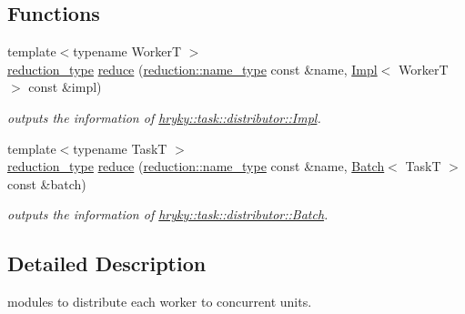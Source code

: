 \subsection*{Functions}
\begin{DoxyCompactItemize}
\item 
\hypertarget{group__task_gaee44063e86225742b935c19f76d7d7c4}{{\footnotesize template$<$typename Worker\-T $>$ }\\\hyperlink{namespacehryky_a343a9a4c36a586be5c2693156200eadc}{reduction\-\_\-type} \hyperlink{group__task_gaee44063e86225742b935c19f76d7d7c4}{reduce} (\hyperlink{namespacehryky_1_1reduction_ac686c30a4c8d196bbd0f05629a6b921f}{reduction\-::name\-\_\-type} const \&name, \hyperlink{classhryky_1_1task_1_1distributor_1_1_impl}{Impl}$<$ Worker\-T $>$ const \&impl)}\label{group__task_gaee44063e86225742b935c19f76d7d7c4}

\begin{DoxyCompactList}\small\item\em outputs the information of \hyperlink{classhryky_1_1task_1_1distributor_1_1_impl}{hryky\-::task\-::distributor\-::\-Impl}. \end{DoxyCompactList}\item 
\hypertarget{group__task_ga89a7a92c43485c438438ab4b97184a27}{{\footnotesize template$<$typename Task\-T $>$ }\\\hyperlink{namespacehryky_a343a9a4c36a586be5c2693156200eadc}{reduction\-\_\-type} \hyperlink{group__task_ga89a7a92c43485c438438ab4b97184a27}{reduce} (\hyperlink{namespacehryky_1_1reduction_ac686c30a4c8d196bbd0f05629a6b921f}{reduction\-::name\-\_\-type} const \&name, \hyperlink{classhryky_1_1task_1_1distributor_1_1_batch}{Batch}$<$ Task\-T $>$ const \&batch)}\label{group__task_ga89a7a92c43485c438438ab4b97184a27}

\begin{DoxyCompactList}\small\item\em outputs the information of \hyperlink{classhryky_1_1task_1_1distributor_1_1_batch}{hryky\-::task\-::distributor\-::\-Batch}. \end{DoxyCompactList}\end{DoxyCompactItemize}


\subsection{Detailed Description}
modules to distribute each worker to concurrent units. 